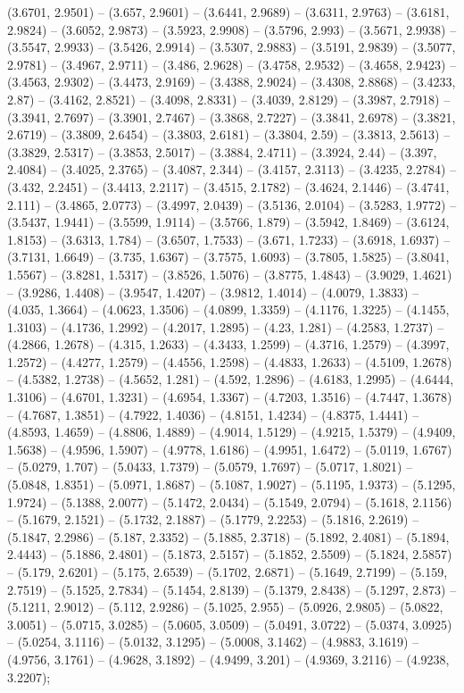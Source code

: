 (3.6701, 2.9501) -- (3.657, 2.9601) -- (3.6441, 2.9689) -- (3.6311, 2.9763) -- (3.6181, 2.9824) -- (3.6052, 2.9873) -- (3.5923, 2.9908) -- (3.5796, 2.993) -- (3.5671, 2.9938) -- (3.5547, 2.9933) -- (3.5426, 2.9914) -- (3.5307, 2.9883) -- (3.5191, 2.9839) -- (3.5077, 2.9781) -- (3.4967, 2.9711) -- (3.486, 2.9628) -- (3.4758, 2.9532) -- (3.4658, 2.9423) -- (3.4563, 2.9302) -- (3.4473, 2.9169) -- (3.4388, 2.9024) -- (3.4308, 2.8868) -- (3.4233, 2.87) -- (3.4162, 2.8521) -- (3.4098, 2.8331) -- (3.4039, 2.8129) -- (3.3987, 2.7918) -- (3.3941, 2.7697) -- (3.3901, 2.7467) -- (3.3868, 2.7227) -- (3.3841, 2.6978) -- (3.3821, 2.6719) -- (3.3809, 2.6454) -- (3.3803, 2.6181) -- (3.3804, 2.59) -- (3.3813, 2.5613) -- (3.3829, 2.5317) -- (3.3853, 2.5017) -- (3.3884, 2.4711) -- (3.3924, 2.44) -- (3.397, 2.4084) -- (3.4025, 2.3765) -- (3.4087, 2.344) -- (3.4157, 2.3113) -- (3.4235, 2.2784) -- (3.432, 2.2451) -- (3.4413, 2.2117) -- (3.4515, 2.1782) -- (3.4624, 2.1446) -- (3.4741, 2.111) -- (3.4865, 2.0773) -- (3.4997, 2.0439) -- (3.5136, 2.0104) -- (3.5283, 1.9772) -- (3.5437, 1.9441) -- (3.5599, 1.9114) -- (3.5766, 1.879) -- (3.5942, 1.8469) -- (3.6124, 1.8153) -- (3.6313, 1.784) -- (3.6507, 1.7533) -- (3.671, 1.7233) -- (3.6918, 1.6937) -- (3.7131, 1.6649) -- (3.735, 1.6367) -- (3.7575, 1.6093) -- (3.7805, 1.5825) -- (3.8041, 1.5567) -- (3.8281, 1.5317) -- (3.8526, 1.5076) -- (3.8775, 1.4843) -- (3.9029, 1.4621) -- (3.9286, 1.4408) -- (3.9547, 1.4207) -- (3.9812, 1.4014) -- (4.0079, 1.3833) -- (4.035, 1.3664) -- (4.0623, 1.3506) -- (4.0899, 1.3359) -- (4.1176, 1.3225) -- (4.1455, 1.3103) -- (4.1736, 1.2992) -- (4.2017, 1.2895) -- (4.23, 1.281) -- (4.2583, 1.2737) -- (4.2866, 1.2678) -- (4.315, 1.2633) -- (4.3433, 1.2599) -- (4.3716, 1.2579) -- (4.3997, 1.2572) -- (4.4277, 1.2579) -- (4.4556, 1.2598) -- (4.4833, 1.2633) -- (4.5109, 1.2678) -- (4.5382, 1.2738) -- (4.5652, 1.281) -- (4.592, 1.2896) -- (4.6183, 1.2995) -- (4.6444, 1.3106) -- (4.6701, 1.3231) -- (4.6954, 1.3367) -- (4.7203, 1.3516) -- (4.7447, 1.3678) -- (4.7687, 1.3851) -- (4.7922, 1.4036) -- (4.8151, 1.4234) -- (4.8375, 1.4441) -- (4.8593, 1.4659) -- (4.8806, 1.4889) -- (4.9014, 1.5129) -- (4.9215, 1.5379) -- (4.9409, 1.5638) -- (4.9596, 1.5907) -- (4.9778, 1.6186) -- (4.9951, 1.6472) -- (5.0119, 1.6767) -- (5.0279, 1.707) -- (5.0433, 1.7379) -- (5.0579, 1.7697) -- (5.0717, 1.8021) -- (5.0848, 1.8351) -- (5.0971, 1.8687) -- (5.1087, 1.9027) -- (5.1195, 1.9373) -- (5.1295, 1.9724) -- (5.1388, 2.0077) -- (5.1472, 2.0434) -- (5.1549, 2.0794) -- (5.1618, 2.1156) -- (5.1679, 2.1521) -- (5.1732, 2.1887) -- (5.1779, 2.2253) -- (5.1816, 2.2619) -- (5.1847, 2.2986) -- (5.187, 2.3352) -- (5.1885, 2.3718) -- (5.1892, 2.4081) -- (5.1894, 2.4443) -- (5.1886, 2.4801) -- (5.1873, 2.5157) -- (5.1852, 2.5509) -- (5.1824, 2.5857) -- (5.179, 2.6201) -- (5.175, 2.6539) -- (5.1702, 2.6871) -- (5.1649, 2.7199) -- (5.159, 2.7519) -- (5.1525, 2.7834) -- (5.1454, 2.8139) -- (5.1379, 2.8438) -- (5.1297, 2.873) -- (5.1211, 2.9012) -- (5.112, 2.9286) -- (5.1025, 2.955) -- (5.0926, 2.9805) -- (5.0822, 3.0051) -- (5.0715, 3.0285) -- (5.0605, 3.0509) -- (5.0491, 3.0722) -- (5.0374, 3.0925) -- (5.0254, 3.1116) -- (5.0132, 3.1295) -- (5.0008, 3.1462) -- (4.9883, 3.1619) -- (4.9756, 3.1761) -- (4.9628, 3.1892) -- (4.9499, 3.201) -- (4.9369, 3.2116) -- (4.9238, 3.2207);
